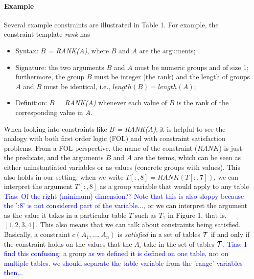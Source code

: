 \documentclass{ecai}
\newcommand{\tias}[1]{\textcolor{blue}{{\sc Tias:} #1}\xspace}
\newcommand{\CName}{Syntax\xspace}
\newcommand{\CSignature}{Signature\xspace}
\newcommand{\CFunction}{Definition\xspace}
\newcommand{\groups}{\ensuremath{\mathcal{G}}\xspace}
\newcommand{\range}[3]{\ensuremath{#1[#2,#3]}}
\newcommand{\rangeall}{:}
\newcommand{\eccalc}[2]{\ensuremath{#1 = #2}}
\newcommand{\ecrank}[2]{\eccalc{#1}{\mathit{RANK}(#2)}}
\begin{document}
\paragraph{Example}
Several example constraints are illustrated in Table 1.  For example, the constraint template \textit{rank} has
\begin{itemize}
\item \CName: \textit{$B$ = RANK($A$)}, where $B$ and $A$ are the arguments;
\item \CSignature: the two arguments $B$ and $A$ must be numeric groups and of size 1; furthermore, the group $B$ must be integer (the rank) and the length of groups $A$ and $B$ must be identical, i.e., $length(B) = length(A)$;
\item \CFunction: \textit{$B$ = RANK($A$)} whenever each value of $B$ is the rank of the corresponding value in $A$.
\end{itemize}

When looking into constraints like \textit{$B$ = RANK($A$)}, it is helpful to see the analogy with both first order logic (FOL) and with constraint satisfaction problems.
From a FOL perspective, the name of the constraint ($RANK$) is just the predicate, and the arguments $B$ and $A$ are the terms, which can be seen as either uninstantiated variables or as values (concrete groups with values).
This also holds in our setting: when we write
      $\ecrank{\range{T}{\rangeall}{8}}{\range{T}{\rangeall}{7}}$,
we can interpret the argument ${\range{T}{\rangeall}{8}}$ as a group variable that would apply to any table \tias{Of the right (minimum) dimension?? Note that this is also sloppy because the ':8' is not considered part of the variable...},
or we can interpret the argument as the value it takes in a particular table $T$ such as $T_1$ in Figure 1, that is, $[1,2,3,4]$.
This also means that we can talk about constraints being satisfied. Basically, a constraint $c(A_1, ..., A_n)$ is {\em satisfied}  in a set of tables ${\cal T}$ if and only
if the constraint holds on the values that the $A_i$ take in the set of tables ${\cal T}$. \tias{I find this confusing: a group as we defined it is defined on one table, not on multiple tables. we should separate the table variable from the 'range' variables then...}
\end{document}
